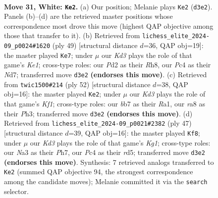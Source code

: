 \documentclass[11pt]{article}
\begin{document}
\clearpage

\begin{figure}[p]\centering
\begin{subfigure}{0.46\textwidth}\centering
\resizebox{\linewidth}{!}{%
\newchessgame
\chessboard[
  setfen={r7/pbpp2k1/1p3n2/5p1p/2P2P2/NP1K4/P2P3P/R2B4 w - - 0 31},
  showmover=false,
  pgfstyle=straightmove, color=movearrow, markmove={d3-e2}
]}
\caption{}
\end{subfigure}\hfill
\begin{subfigure}{0.46\textwidth}\centering
\resizebox{\linewidth}{!}{%
\newchessgame
\chessboard[
  setfen={4k2r/1p1n1pp1/1pb1p3/7p/P4B2/2N4P/1P3PP1/R5K1 b k - 4 25},
  showmover=false,
  pgfstyle=straightmove, color=movearrow, markmove={e8-e7}
]}
\caption{}
\end{subfigure}
\\[4pt]
\begin{subfigure}{0.46\textwidth}\centering
\resizebox{\linewidth}{!}{%
\newchessgame
\chessboard[
  setfen={5k2/ppp2ppp/5n2/P2r4/2N5/2P4P/1P3PP1/R4K2 w - - 0 27},
  showmover=false,
  pgfstyle=straightmove, color=movearrow, markmove={f1-e2}
]}
\caption{}
\end{subfigure}\hfill
\begin{subfigure}{0.46\textwidth}\centering
\resizebox{\linewidth}{!}{%
\newchessgame
\chessboard[
  setfen={r5k1/pp2pp1p/5bp1/3R4/8/2P2N1P/PP3PP1/6K1 b - - 0 24},
  showmover=false,
  pgfstyle=straightmove, color=movearrow, markmove={g8-f8}
]}
\caption{}
\end{subfigure}
\caption{\textbf{Move 31, White: \texttt{Ke2}.} (a) Our position; Melanie plays \texttt{Ke2} (\texttt{d3e2}). Panels (b)--(d) are the retrieved master positions whose correspondence most drove this move (highest QAP objective among those that transfer to it). (b) Retrieved from \texttt{lichess\_elite\_2024-09\_p0024\#1620} (ply 49) [structural distance $d$=36, QAP obj=19]: the master played \texttt{Ke7}; under $\mu$ our \emph{Kd3} plays the role of that game's \emph{Ke1}; cross-type roles: our \emph{P}d2 as their \emph{R}h8, our \emph{P}c4 as their \emph{N}d7; transferred move \texttt{d3e2} \textbf{(endorses this move)}. (c) Retrieved from \texttt{twic1500\#214} (ply 52) [structural distance $d$=38, QAP obj=16]: the master played \texttt{Ke2}; under $\mu$ our \emph{Kd3} plays the role of that game's \emph{Kf1}; cross-type roles: our \emph{b}b7 as their \emph{R}a1, our \emph{r}a8 as their \emph{P}h3; transferred move \texttt{d3e2} \textbf{(endorses this move)}. (d) Retrieved from \texttt{lichess\_elite\_2024-09\_p0021\#2382} (ply 47) [structural distance $d$=39, QAP obj=16]: the master played \texttt{Kf8}; under $\mu$ our \emph{Kd3} plays the role of that game's \emph{Kg1}; cross-type roles: our \emph{N}a3 as their \emph{P}h7, our \emph{P}c4 as their \emph{r}d5; transferred move \texttt{d3e2} \textbf{(endorses this move)}. Synthesis: 7 retrieved analogs transferred to \texttt{Ke2} (summed QAP objective 94, the strongest correspondence among the candidate moves); Melanie committed it via the \texttt{search} selector.}
\label{fig:thought-m60}
\end{figure}
\end{document}
